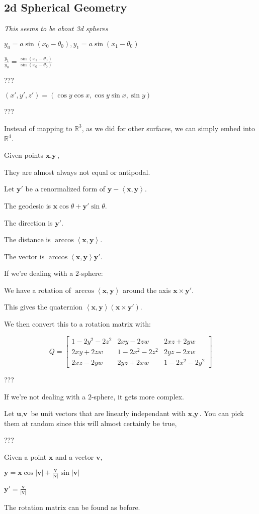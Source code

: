 \subsection{2d Spherical Geometry}

\emph{This seems to be about 3d spheres}

$y_0 = a\sin(x_0-\theta_0), y_1 = a\sin(x_1-\theta_0)$

$\frac{y_1}{y_0} = \frac{\sin(x_1-\theta_0)}{\sin(x_0-\theta_0)}$

???

$(x',y',z') = (\cos y \cos x, \cos y \sin x, \sin y)$

???

Instead of mapping to $\mathbb{R}^3$, as we did for other surfaces, we can simply embed into $\mathbb{R}^4$.


Given points $\textbf{x}, \textbf{y}$,

They are almost always not equal or antipodal.

Let $\textbf{y}'$ be a renormalized form of $\textbf{y}-\left<\textbf{x},\textbf{y}\right>$.

The geodesic is $\textbf{x}\cos\theta+\textbf{y}'\sin\theta$.

The direction is $\textbf{y}'$.

The distance is $\arccos\left<\textbf{x},\textbf{y}\right>$.

The vector is $\arccos\left<\textbf{x},\textbf{y}\right>\textbf{y}'$.

If we're dealing with a $2$-sphere:

We have a rotation of $\arccos\left<\textbf{x},\textbf{y}\right>$ around the axis $\textbf{x} \times \textbf{y}'$.

This gives the quaternion $\left<\textbf{x},\textbf{y}\right>(\textbf{x} \times \textbf{y}')$.

We then convert this to a rotation matrix with:

$$Q = \begin{bmatrix}
    1 - 2 y^2 - 2 z^2 & 2 x y - 2 z w & 2 x z + 2 y w \\
    2 x y + 2 z w & 1 - 2 x^2 - 2 z^2 & 2 y z - 2 x w \\
    2 x z - 2 y w & 2 y z + 2 x w & 1 - 2 x^2 - 2 y^2
\end{bmatrix}$$

???

If we're not dealing with a $2$-sphere, it gets more complex.

Let $\textbf{u}, \textbf{v}$ be unit vectors that are linearly independant with $\textbf{x}, \textbf{y}$. You can pick them at random since this will almost certainly be true, 

???

Given a point $\textbf{x}$ and a vector $\textbf{v}$,

$\textbf{y} = \textbf{x}\cos|\textbf{v}|+\frac{\textbf{v}}{|\textbf{v}|}\sin|\textbf{v}|$

$\textbf{y}' = \frac{\textbf{v}}{|\textbf{v}|}$

The rotation matrix can be found as before.


